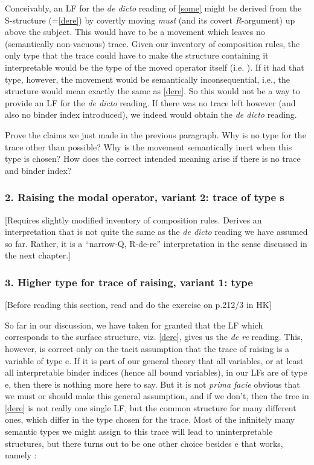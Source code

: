 Conceivably, an LF for the \emph{de dicto} reading of \ref{some} might be derived from the S-structure (=\ref{dere}) by covertly moving \emph{must} (and its covert \emph{R}-argument) up above the subject. This would have to be a movement which leaves no (semantically non-vacuous) trace. Given our inventory of composition rules, the only type that the trace could have to make the structure containing it interpretable would be the type of the moved operator itself (i.e. ). If it had that type, however, the movement would be semantically inconsequential, i.e., the structure would mean exactly the same as \ref{dere}. So this would not be a way to provide an LF for the \emph{de dicto} reading. If there was no trace left however (and also no binder index introduced), we indeed would obtain the \emph{de dicto} reading.
\begin{exercise}
	Prove the claims we just made in the previous paragraph. Why is no type for the trace other than  possible? Why is the movement semantically inert when this type is chosen? How does the correct intended meaning arise if there is no trace and binder index? \eex 
\end{exercise}

\subsubsection{2. Raising the modal operator, variant 2: trace of type s}

[Requires slightly modified inventory of composition rules. Derives an
interpretation that is not quite the same as the \emph{de dicto}
reading we have assumed so far. Rather, it is a ``narrow-Q, R-de-re''
interpretation in the sense discussed in the next chapter.]

\subsubsection{3. Higher type for trace of raising, variant 1: type  }

[Before reading this section, read and do the exercise on p.212/3 in H\amp K]

\absatz So far in our discussion, we have taken for granted that the LF which corresponds to the surface structure, viz. \ref{dere}, gives us the \emph{de re} reading. This, however, is correct only on the tacit assumption that the trace of raising is a variable of type e. If it is part of our general theory that all variables, or at least all interpretable binder indices (hence all bound variables), in our LFs are of type e, then there is nothing more here to say. But it is not \emph{prima facie} obvious that we must or should make this general assumption, and if we don't, then the tree in \ref{dere} is not really one single LF, but the common structure for many different ones, which differ in the type chosen for the trace. Most of the infinitely many semantic types we might assign to this trace will lead to uninterpretable structures, but there turns out to be one other choice besides e that works, namely :


